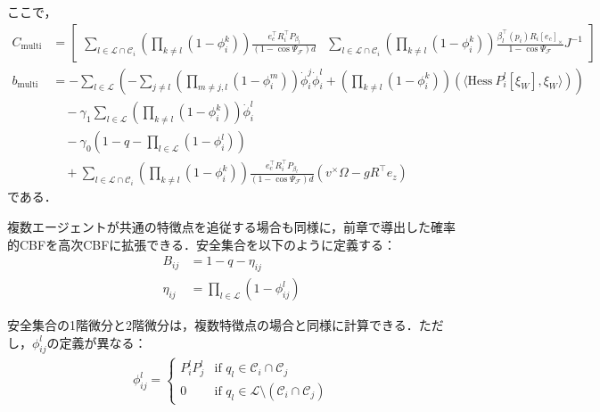 ここで，
\begin{equation}
\begin{aligned}
C_{\mathrm{multi}} &= \begin{bmatrix}
\sum_{l \in \mathcal{L} \cap \mathcal{C}_i} \left(\prod_{k \neq l} (1 - \phi_i^k)\right) \frac{e_c^\top R_i^\top P_{\beta_l}}{(1 - \cos\Psi_\mathcal{F}) d} & \sum_{l \in \mathcal{L} \cap \mathcal{C}_i} \left(\prod_{k \neq l} (1 - \phi_i^k)\right) \frac{\beta_l^\top(p_i) R_i [e_c]_\times}{1 - \cos\Psi_\mathcal{F}} J^{-1}
\end{bmatrix} \\
b_{\mathrm{multi}} &= -\sum_{l \in \mathcal{L}} \left(-\sum_{j \neq l} \left(\prod_{m \neq j, l} (1 - \phi_i^m)\right) \dot{\phi}_i^j \dot{\phi}_i^l + \left(\prod_{k \neq l} (1 - \phi_i^k)\right) (\langle \mathrm{Hess}\:P_i^l[\xi_W], \xi_W \rangle)\right) \\
&\quad - \gamma_1 \sum_{l \in \mathcal{L}} \left(\prod_{k \neq l} (1 - \phi_i^k)\right) \dot{\phi}_i^l \\
&\quad - \gamma_0 (1 - q - \prod_{l \in \mathcal{L}} (1 - \phi_i^l)) \\
&\quad + \sum_{l \in \mathcal{L} \cap \mathcal{C}_i} \left(\prod_{k \neq l} (1 - \phi_i^k)\right) \frac{e_c^\top R_i^\top P_{\beta_l}}{(1 - \cos\Psi_\mathcal{F}) d} (v^\times \Omega - g R^\top e_z)
\label{eq:multi_hocbf_qp_params}
\end{aligned}
\end{equation}
である．

複数エージェントが共通の特徴点を追従する場合も同様に，前章で導出した確率的CBFを高次CBFに拡張できる．安全集合を以下のように定義する：
\begin{equation}
\begin{aligned}
B_{ij} &= 1 - q - \eta_{ij} \\
\eta_{ij} &= \prod_{l \in \mathcal{L}} (1 - \phi_{ij}^l)
\label{eq:common_hocbf_safe_set}
\end{aligned}
\end{equation}

安全集合の1階微分と2階微分は，複数特徴点の場合と同様に計算できる．ただし，$\phi_{ij}^l$の定義が異なる：
\begin{equation}
\begin{aligned}
\phi_{ij}^l = 
\begin{cases}
P_i^l P_j^l & \text{if } q_l \in \mathcal{C}_i \cap \mathcal{C}_j \\
0 & \text{if } q_l \in \mathcal{L} \setminus (\mathcal{C}_i \cap \mathcal{C}_j)
\end{cases}
\label{eq:common_probability_hocbf}
\end{aligned}
\end{equation}

